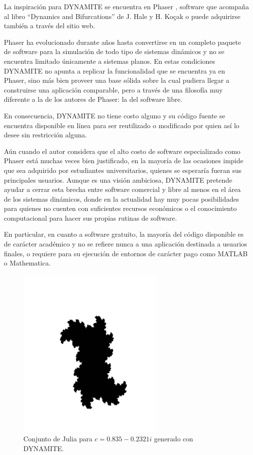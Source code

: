 \documentclass[11pt]{book}
\theoremstyle{definition}
\numberwithin{definition}{section}
\theoremstyle{theorem}
\numberwithin{theorem}{section}
\numberwithin{lemma}{section}
\numberwithin{corollary}{section}
\theoremstyle{plain}
\numberwithin{example}{section}
\begin{document}
La inspiración para DYNAMITE se encuentra en Phaser \cite{phaser}, software que acompaña al libro ``Dynamics and Bifurcations'' \cite{dynandbif} de J. Hale y H. Ko\c{c}ak o puede adquirirse también a través del sitio web.

Phaser ha evolucionado durante años hasta convertirse en un completo paquete de software para la simulación de todo tipo de sistemas dinámicos y no se encuentra limitado únicamente a sistemas planos. En estas condiciones DYNAMITE no apunta a replicar la funcionalidad que se encuentra ya en Phaser, sino más bien proveer una base sólida sobre la cual pudiera llegar a construirse una aplicación comparable, pero a través de una filosofía muy diferente a la de los autores de Phaser: la del software libre.

En consecuencia, DYNAMITE no tiene costo alguno y su código fuente se encuentra disponible en línea \cite{dynamite} para ser reutilizado o modificado por quien así lo desee sin restricción alguna.

Aún cuando el autor considera que el alto costo de software especializado como Phaser está muchas veces bien justificado, en la mayoría de las ocasiones impide que sea adquirido por estudiantes universitarios, quienes se esperaría fueran sus principales usuarios.
Aunque es una visión ambiciosa, DYNAMITE pretende ayudar a cerrar esta brecha entre software comercial y libre al menos en el área de los sistemas dinámicos, donde en la actualidad hay muy pocas posibilidades para quienes no cuenten con suficientes recursos económicos o el conocimiento computacional para hacer sus propias rutinas de software.

En particular, en cuanto a software gratuito, la mayoría del código disponible es de carácter académico \cite{chaospython,chaosatmaryland,stonydynamics,cornelldynamics} y no se refiere nunca a una aplicación destinada a usuarios finales, o requiere para su ejecución de entornos de carácter pago como MATLAB o Mathematica.

\begin{figure}[!ht] \label{fig:dynamite} \centering
	\includegraphics[scale=0.7]{figures/juliaset.png}
	\caption{Conjunto de Julia para $c = 0.835 - 0.2321i$ generado con DYNAMITE.}
\end{figure}
\end{document}
